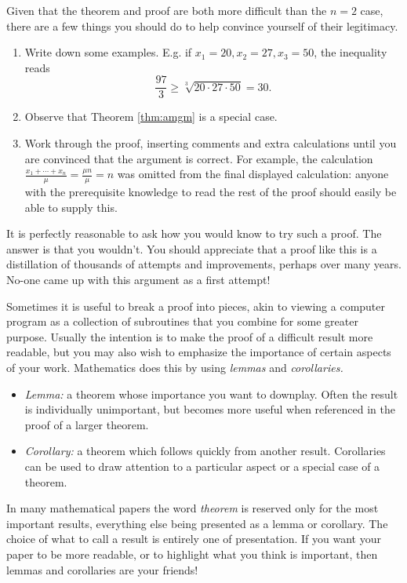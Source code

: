  Given that the theorem and proof are both more difficult than the $n=2$ case, there are a few things you should do to help convince yourself of their legitimacy.
\begin{enumerate}\setlength{\itemsep}{0pt}
  \item Write down some examples. E.g. if $x_1=20,x_2=27,x_3=50$, the inequality reads
  \[\frac{97}3\ge\sqrt[3]{20\cdot 27\cdot 50}=30.\]
  \item Observe that Theorem \ref{thm:amgm} is a special case.
  \item Work through the proof, inserting comments and extra calculations until you are convinced that the argument is correct. For example, the calculation $\frac{x_1+\cdots+x_n}{\mu}=\frac{\mu n}\mu=n$ was omitted from the final displayed calculation: anyone with the prerequisite knowledge to read the rest of the proof should easily be able to supply this.
\end{enumerate}

 It is perfectly reasonable to ask how you would know to try such a proof. The answer is that you wouldn't. You should appreciate that a proof like this is a distillation of thousands of attempts and improvements, perhaps over many years. No-one came up with this argument as a first attempt!



Sometimes it is useful to break a proof into pieces, akin to viewing a computer program as a collection of subroutines that you combine for some greater purpose. Usually the intention is to make the proof of a difficult result more readable, but you may also wish to emphasize the importance of certain aspects of your work. Mathematics does this by using \emph{lemmas} and \emph{corollaries.}

\begin{itemize}\setlength{\itemsep}{0pt}
  \item[]\emph{Lemma:} a theorem whose importance you want to downplay. Often the result is individually unimportant, but becomes more useful when referenced in the proof of a larger theorem.
  \item[]\emph{Corollary:} a theorem which follows quickly from another result. Corollaries can be used to draw attention to a particular aspect or a special case of a theorem.
\end{itemize}

 In many mathematical papers the word \emph{theorem} is reserved only for the most important results, everything else being presented as a lemma or corollary. The choice of what to call a result is entirely one of presentation. If you want your paper to be more readable, or to highlight what you think is important, then lemmas and corollaries are your friends!\pagebreak[2]

